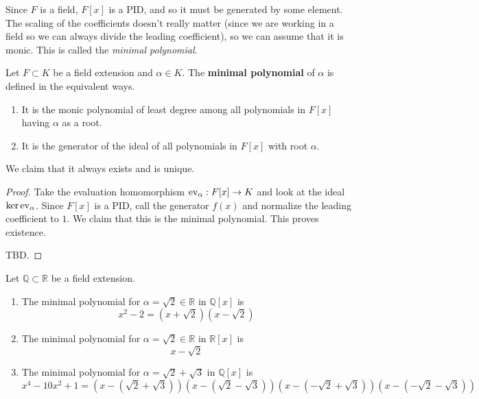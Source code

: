   Since $F$ is a field, $F[x]$ is a PID, and so it must be generated by some element. The scaling of the coefficients doesn't really matter (since we are working in a field so we can always divide the leading coefficient), so we can assume that it is monic. This is called the \textit{minimal polynomial}. 

  \begin{definition}
    \label{def:min_poly}
    Let $F \subset K$ be a field extension and $\alpha \in K$. The \textbf{minimal polynomial} of $\alpha$ is defined in the equivalent ways. 
    \begin{enumerate}
      \item It is the monic polynomial of least degree among all polynomials in $F[x]$ having $\alpha$ as a root. 
      \item It is the generator of the ideal of all polynomials in $F[x]$ with root $\alpha$. 
    \end{enumerate}
    We claim that it always exists and is unique. 
  \end{definition} 
  \begin{proof}
    Take the evaluation homomorphism $\ev_\alpha: F[x] \to K$ and look at the ideal $\ker{\ev_\alpha}$. Since $F[x]$ is a PID, call the generator $f(x)$ and normalize the leading coefficient to $1$. We claim that this is the minimal polynomial. This proves existence. 

    TBD. 
  \end{proof}

  \begin{example}
    Let $\mathbb{Q} \subset \mathbb{R}$ be a field extension. 
    \begin{enumerate}
      \item The minimal polynomial for $\alpha = \sqrt{2} \in \mathbb{R}$ in $\mathbb{Q}[x]$ is 
      \begin{equation}
        x^2 - 2 = (x + \sqrt{2}) (x - \sqrt{2})
      \end{equation}

      \item The minimal polynomial for $\alpha = \sqrt{2} \in \mathbb{R}$ in $\mathbb{R}[x]$ is 
      \begin{equation}
        x - \sqrt{2}
      \end{equation}

      \item The minimal polynomial for $\alpha = \sqrt{2} + \sqrt{3}$ in $\mathbb{Q}[x]$ is 
      \begin{equation}
        x^4 - 10x^2 + 1 = (x - (\sqrt{2} + \sqrt{3}))(x - (\sqrt{2} - \sqrt{3}))(x - (-\sqrt{2} + \sqrt{3}))(x - (-\sqrt{2} - \sqrt{3}))
      \end{equation}
    \end{enumerate}
  \end{example}

